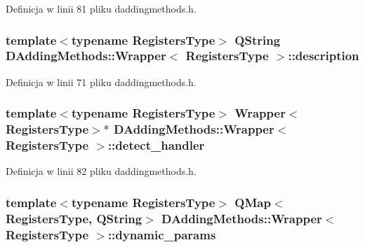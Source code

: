 Definicja w linii 81 pliku daddingmethods.\-h.

\hypertarget{class_d_adding_methods_1_1_wrapper_a1f27a97876d639a2e39482c4a3a6d274}{
\subsubsection[{description}]{\setlength{\rightskip}{0pt plus 5cm}template$<$typename Registers\-Type$>$ Q\-String {\bf D\-Adding\-Methods\-::\-Wrapper}$<$ Registers\-Type $>$\-::description}}\label{class_d_adding_methods_1_1_wrapper_a1f27a97876d639a2e39482c4a3a6d274}


Definicja w linii 71 pliku daddingmethods.\-h.

\hypertarget{class_d_adding_methods_1_1_wrapper_aaa3fdb9659e74c099359cc0af48e4233}{
\subsubsection[{detect\-\_\-handler}]{\setlength{\rightskip}{0pt plus 5cm}template$<$typename Registers\-Type$>$ {\bf Wrapper}$<$Registers\-Type$>$$\ast$ {\bf D\-Adding\-Methods\-::\-Wrapper}$<$ Registers\-Type $>$\-::detect\-\_\-handler}}\label{class_d_adding_methods_1_1_wrapper_aaa3fdb9659e74c099359cc0af48e4233}


Definicja w linii 82 pliku daddingmethods.\-h.

\hypertarget{class_d_adding_methods_1_1_wrapper_ac11ddb3500c96e6175c4b939cc726d4d}{
\subsubsection[{dynamic\-\_\-params}]{\setlength{\rightskip}{0pt plus 5cm}template$<$typename Registers\-Type$>$ Q\-Map$<$Registers\-Type, Q\-String$>$ {\bf D\-Adding\-Methods\-::\-Wrapper}$<$ Registers\-Type $>$\-::dynamic\-\_\-params}}\label{class_d_adding_methods_1_1_wrapper_ac11ddb3500c96e6175c4b939cc726d4d}


